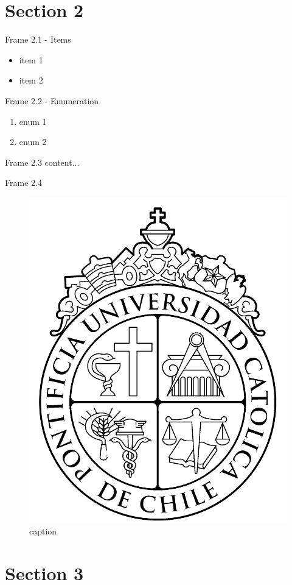 \documentclass[xcolor=svgnames]{beamer}
\numberwithin{equation}{section}
\numberwithin{figure}{section}
\begin{document}
\section{Section 2}
\begin{frame}{Frame 2.1 - Items}
	\begin{itemize}
		\item item 1
		\item item 2
	\end{itemize}
\end{frame}

\begin{frame}{Frame 2.2 - Enumeration}
	\begin{enumerate}
		\item enum 1
		\item enum 2
	\end{enumerate}
\end{frame}

\begin{frame}{Frame 2.3}
	content...
\end{frame}

\begin{frame}{Frame 2.4}
	\begin{figure}[h]
		\centering
		\caption{caption}
		\includegraphics[width=.3\linewidth]{logo_uc}
	\end{figure}
\end{frame}

\section{Section 3}

\lastrealframe
\end{document}
